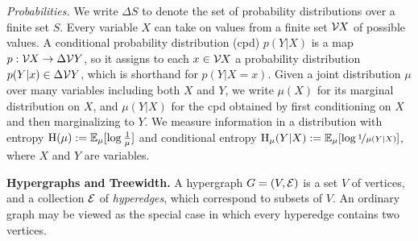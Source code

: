 \documentclass[twoside]{article}
\begin{document}
\textit{Probabilities.}
We write $\Delta S$ to denote the set of probability distributions over a finite set $S$.
Every variable $X$ can take on values from a finite set $\mathcal V\mskip-1mu X$ of possible values.
A conditional probability distribution (cpd) $p(Y|X)$ is a map
$p : \mathcal V\mskip-1mu  X \to \Delta \mathcal V Y$, so it assigns to each $x \in \mathcal V\mskip-1mu X$ a
probability distribution $p(Y|x) \in \Delta \mathcal V Y$, which is shorthand for $p(Y|X\!\!=\!x)$.
Given a joint distribution $\mu$ over many variables including both $X$ and $Y$,
we write $\mu(X)$ for its marginal distribution on $X$,
and $\mu(Y|X)$ for the cpd obtained by first conditioning on $X$ and then marginalizing to $Y$.
We measure information in a distribution with entropy $\operatorname{\mathrm{H}}(\mu) := \operatorname*{\mathbb{E}}_{\mu} [\log \frac1\mu]$ and conditional entropy $\operatorname{\mathrm{H}}_\mu(Y|X) := \operatorname*{\mathbb{E}}_\mu[\log\nicefrac1{\mu(Y|X)}]$, where $X$ and $Y$ are variables.



\textbf{Hypergraphs and Treewidth.}
A hypergraph $G = (V, \mathcal E)$ is a set $V$ of vertices, and a collection $\mathcal E$ of \emph{hyperedges}, which correspond to subsets of $V$.
An ordinary graph may be viewed as the special case in which every hyperedge contains  two vertices.
\end{document}
